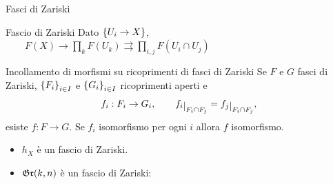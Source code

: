 \documentclass[a4paper]{beamer}
\begin{document}
\begin{frame}{Fasci di Zariski}
\begin{block}{Fascio di Zariski}
Dato $\left\{{U_i\to X}\right\}$, $\qquad F(X)\to \displaystyle \prod_k F(U_k) \rightrightarrows \displaystyle \prod_{i,j}F(U_i\cap U_j)$
\end{block}
\pause
\begin{alertblock}{Incollamento di morfismi su ricoprimenti di fasci di Zariski}
Se $F$ e $G$ fasci di Zariski, $\left\{{F_i}\right\}_{i\in I}$ e $\left\{{G_i}\right\}_{i\in I}$ ricoprimenti aperti e 
\[f_i:F_i\to G_i,\qquad f_i\res{F_i\cap F_j}=f_j\res{F_i\cap F_j},\]
esiste $f:F\to G$. 
Se $f_i$ isomorfismo per ogni $i$ allora $f$ isomorfismo.
\end{alertblock}
\pause
\begin{itemize}
\item $h_X$ \`e un fascio di Zariski.\pause
\item $\mathfrak{Gr}(k,n)$ \`e un fascio di Zariski: 
\end{itemize}
\end{frame}

\end{document}
